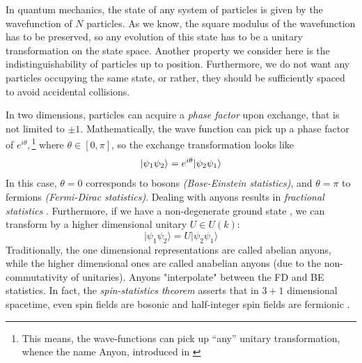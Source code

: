 \documentclass{article}
\begin{document}
In quantum mechanics, the state of any system of particles is given by the wavefunction of $N$ particles. As we know, the square modulus of the wavefunction has to be preserved, so any evolution of this state has to be a unitary transformation on the state space. Another property we consider here is the indistinguishability of particles up to position. Furthermore, we do not want any particles occupying the same state, or rather, they should be sufficiently spaced to avoid accidental collisions.
%

In two dimensions, particles can acquire a {\it phase factor} upon exchange, that is not limited to $\pm 1$. Mathematically, the wave function can pick up a phase factor of $e^{i\theta},$\footnote{\label{AnyonName}
 This means, the wave-functions can pick up ``any'' unitary transformation, whence the name Anyon, introduced in \cite{wilczek_quantum_1982}} where $\theta \in [0,\pi]$, so the exchange transformation looks like
\[
  \vert \psi_1 \psi_2 \rangle = e^{i \theta} \vert \psi_2 \psi_1 \rangle
\]
In this case, $\theta = 0$ corresponds to bosons {\it (Bose-Einstein statistics)}, and $\theta = \pi$ to fermions {\it (Fermi-Dirac statistics)}. Dealing with anyons results in {\it fractional statistics} \cite{greiter_fractional_2022}\cite{wilczek_quantum_1982}. Furthermore, if we have a non-degenerate ground state \cite{myers_topological_2024}, we can transform by a higher dimensional unitary $U \in U(k)$:
\[
  \vert \psi_1 \psi_2 \rangle = U \vert \psi_2 \psi_1 \rangle
\]
Traditionally, the one dimensional representations are called abelian anyons, while the higher dimensional ones are called anabelian anyons (due to the non-commutativity of unitaries).
Anyons "interpolate" between the FD and BE statistics. In fact, the {\it spin-statistics theorem} asserts that in $3 + 1$ dimensional spacetime, even spin fields are bosonic and half-integer spin fields are fermionic \cite{pauli_connection_1940}.
\end{document}
